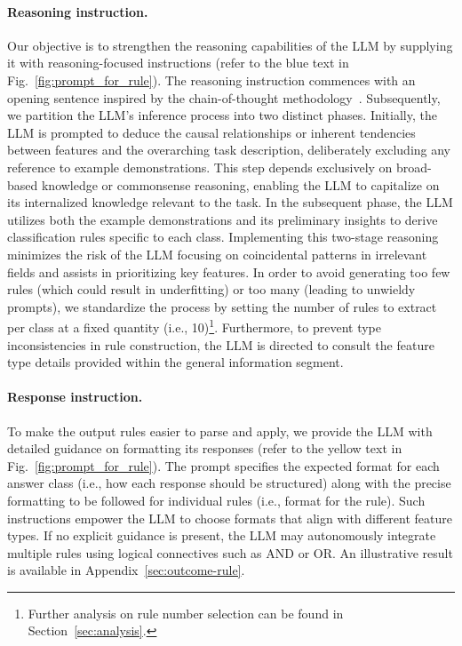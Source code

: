 \paragraph{Reasoning instruction.} Our objective is to strengthen the reasoning capabilities of the LLM by supplying it with reasoning-focused instructions (refer to the blue text in Fig.~\ref{fig:prompt_for_rule}). The reasoning instruction commences with an opening sentence inspired by the chain-of-thought methodology~\cite{wei2022chain}. Subsequently, we partition the LLM’s inference process into two distinct phases. Initially, the LLM is prompted to deduce the causal relationships or inherent tendencies between features and the overarching task description, deliberately excluding any reference to example demonstrations. This step depends exclusively on broad-based knowledge or commonsense reasoning, enabling the LLM to capitalize on its internalized knowledge relevant to the task. In the subsequent phase, the LLM utilizes both the example demonstrations and its preliminary insights to derive classification rules specific to each class. Implementing this two-stage reasoning minimizes the risk of the LLM focusing on coincidental patterns in irrelevant fields and assists in prioritizing key features. In order to avoid generating too few rules (which could result in underfitting) or too many (leading to unwieldy prompts), we standardize the process by setting the number of rules to extract per class at a fixed quantity (i.e., 10)\footnote{Further analysis on rule number selection can be found in Section~\ref{sec:analysis}.}. Furthermore, to prevent type inconsistencies in rule construction, the LLM is directed to consult the feature type details provided within the general information segment. 

\vspace*{-0.12in}
\paragraph{Response instruction.} To make the output rules easier to parse and apply, we provide the LLM with detailed guidance on formatting its responses (refer to the yellow text in Fig.~\ref{fig:prompt_for_rule}). The prompt specifies the expected format for each answer class (i.e., how each response should be structured) along with the precise formatting to be followed for individual rules (i.e., format for the rule). Such instructions empower the LLM to choose formats that align with different feature types. If no explicit guidance is present, the LLM may autonomously integrate multiple rules using logical connectives such as AND or OR. An illustrative result is available in Appendix~\ref{sec:outcome-rule}.

